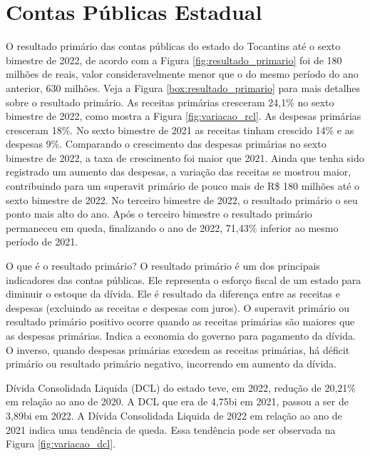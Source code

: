 \documentclass[twocolumn, a4paper, 10pt]{report}
\begin{document}
    
    \hypertarget{contas-puxfablicas-estadual}{%
    \chapter{Contas Públicas
    Estadual}\label{contas-puxfablicas-estadual}}

    O resultado primário das contas públicas do estado do Tocantins até
    o sexto bimestre de 2022, de acordo com a Figura
    \ref{fig:resultado_primario} foi de 180 milhões de reais, valor
    consideravelmente menor que o do mesmo período do ano anterior, 630
    milhões. Veja a Figura \ref{box:resultado_primario} para mais
    detalhes sobre o resultado primário. As receitas primárias cresceram
    24,1\% no sexto bimestre de 2022, como mostra a Figura
    \ref{fig:variacao_rcl}. As despesas primárias cresceram 18\%. No
    sexto bimestre de 2021 as receitas tinham crescido 14\% e as
    despesas 9\%. Comparando o crescimento das despesas primárias no
    sexto bimestre de 2022, a taxa de crescimento foi maior que 2021.
    Ainda que tenha sido registrado um aumento das despesas, a variação
    das receitas se mostrou maior, contribuindo para um superavit
    primário de pouco mais de R\$ 180 milhões até o sexto bimestre de
    2022. No terceiro bimestre de 2022, o resultado primário o seu ponto
    mais alto do ano. Após o terceiro bimestre o resultado primário
    permaneceu em queda, finalizando o ano de 2022, 71,43\% inferior ao
    mesmo período de 2021.

    \begin{smbox}[label={box:resultado_primario}]{O que é o resultado primário?}
    O resultado primário é um dos principais indicadores das contas
    públicas. Ele representa o esforço fiscal de um estado para diminuir
    o estoque da dívida. Ele é resultado da diferença entre as receitas
    e despesas (excluindo as receitas e despesas com juros). O superavit
    primário ou resultado primário positivo ocorre quando as receitas
    primárias são maiores que as despesas primárias. Indica a economia
    do governo para pagamento da dívida. O inverso, quando despesas
    primárias excedem as receitas primárias, há déficit primário ou
    resultado primário negativo, incorrendo em aumento da dívida.

    \end{smbox}

    Dívida Consolidada Liquida (DCL) do estado teve, em 2022, redução de
    20,21\% em relação ao ano de 2020. A DCL que era de 4,75bi em 2021,
    passou a ser de 3,89bi em 2022. A Dívida Consolidada Liquida de 2022
    em relação ao ano de 2021 indica uma tendência de queda. Essa
    tendência pode ser observada na Figura \ref{fig:variacao_dcl}.
\end{document}
